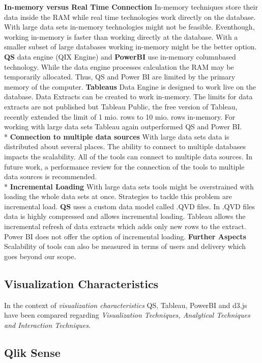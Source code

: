 \textbf{In-memory versus Real Time Connection}
In-memory techniques store their data inside the RAM while real time technologies work directly on the database.
With large data sets in-memory technologies might not be feasible. Eventhough, working in-memory is faster than working directly at the database. With a smaller subset of large databases working in-memory might be the better option. 
\textbf{QS} data engine (QIX Engine) and \textbf{PowerBI} use in-memory columnbased technology. While the data engine processes calculation the RAM may be temporarily allocated. Thus, QS and Power BI are limited by the primary memory of the computer. \textbf{Tableaus} Data Engine is designed to work live on the database. Data Extracts can be created to work in-memory. The limits for data extracts are not published but Tableau Public, the free version of Tableau, recently extended the limit of 1 mio. rows to 10 mio. rows in-memory. 
For working with large data sets Tableau again outperformed QS and Power BI.\\*
\textbf{Connection to multiple data sources}
With large data sets data is distributed about several places. The ability to connect to multiple databases impacts the scalability. All of the tools can connect to multiple data sources. In future work, a performance review for the connection of the tools to multiple data sources is recommended.\\*
\textbf{Incremental Loading}
With large data sets tools might be overstrained with loading the whole data sets at once. Strategies to tackle this problem are incremental load. \textbf{QS} uses a custom data model called .QVD files. In .QVD files data is highly compressed and allows incremental loading. Tableau allows the incremental refresh of data extracts which adds only new rows to the extract. Power BI does not offer the option of incremental loading. 
\textbf{Further Aspects}
Scalability of tools can also be measured in terms of users and delivery which goes beyond our scope.




\subsection{Visualization Characteristics}
In the context of \textit{visualization characteristics} QS, Tableau, PowerBI and d3.js have been compared regarding \textit{Visualization Techniques, Analytical Techniques and Interaction Techniques}. 

\subsection*{Qlik Sense}

